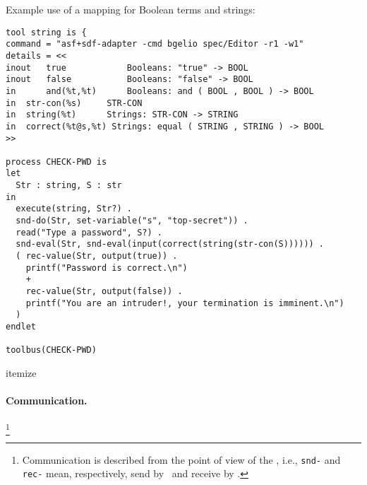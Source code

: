 Example use of a mapping for Boolean terms and strings:
\begin{verbatim}
tool string is { 
command = "asf+sdf-adapter -cmd bgelio spec/Editor -r1 -w1"
details = <<
inout   true            Booleans: "true" -> BOOL
inout   false           Booleans: "false" -> BOOL
in      and(%t,%t)      Booleans: and ( BOOL , BOOL ) -> BOOL
in	str-con(%s)     STR-CON
in	string(%t)      Strings: STR-CON -> STRING
in	correct(%t@s,%t) Strings: equal ( STRING , STRING ) -> BOOL
>>

process CHECK-PWD is
let
  Str : string, S : str
in
  execute(string, Str?) .
  snd-do(Str, set-variable("s", "top-secret")) .
  read("Type a password", S?) .
  snd-eval(Str, snd-eval(input(correct(string(str-con(S)))))) .
  ( rec-value(Str, output(true)) .
    printf("Password is correct.\n")
    +
    rec-value(Str, output(false)) .
    printf("You are an intruder!, your termination is imminent.\n")
  )
endlet

toolbus(CHECK-PWD)
\end{verbatim}
{itemize}

\paragraph{Communication.} \hspace{-0.3cm}\footnote{Communication is described
from the point of view of the \TB, i.e., {\tt snd-} and {\tt rec-}
mean, respectively, send by \TB\ and receive by \TB.}



